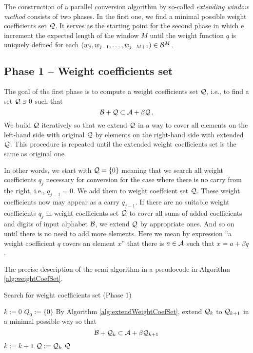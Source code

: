 The construction of a parallel conversion algorithm by so-called \emph{extending window method} consists of two phases. In the first one, we find a minimal possible weight coefficients set $\mathcal{Q}$. It serves as the starting point for the second phase in which e increment the expected length of the window $M$ until the weight function $q$ is uniquely defined for each $(w_j,w_{j-1}, \dots , w_{j-M+1}) \in \mathcal{B}^{M}$.

\subsection{Phase 1 -- Weight coefficients set}
The goal of the first phase is to compute a weight coefficients set $\mathcal{Q}$, i.e., to find a set $\mathcal{Q} \ni 0$ such that 
$$
    \mathcal{B} + \mathcal{Q} \subset \mathcal{A} + \beta \mathcal{Q}\,.
$$  
We build $\mathcal{Q}$ iteratively so that we extend $\mathcal{Q}$ in a way to cover all elements on the left-hand side with original $\mathcal{Q}$ by elements on the right-hand side with extended $\mathcal{Q}$. This procedure is repeated until the extended weight coefficients set is the same as original one. 

In other words, we start with $\mathcal{Q}=\{0\}$ meaning that we search all weight coefficients $q_j$ necessary for conversion for the case where there is no carry from the right, i.e., $q_{j-1}=0$. We add them to weight coeffcient set $\mathcal{Q}$. These weight coefficients now may appear as a carry $q_{j-1}$. If there are no suitable weight coefficients $q_j$ in weight coefficients set $\mathcal{Q}$ to cover all sums of added coefficients and digits of input alphabet $\mathcal{B}$, we extend $\mathcal{Q}$ by appropriate ones. And so on until there is no need to add more elements. Here we mean by expression ``a weight coefficient $q$ covers an element $x$'' that there is $a \in \mathcal{A}$ such that $x=a + \beta q$.
    
The precise description of the semi-algorithm in a pseudocode in Algorithm \ref{alg:weightCoefSet}.  
    
\begin{algorithm}
  \caption{Search for weight coefficients set (Phase 1)}
    \label{alg:weightCoefSet}
  \begin{algorithmic}[1]
    \STATE $k:=0$ 
    \STATE $Q_0:=\{0\}$
    \REPEAT
     \STATE  By Algorithm \ref{alg:extendWeightCoefSet}, extend $\mathcal{Q}_k$ to $\mathcal{Q}_{k+1}$ in a minimal possible way so that $$\mathcal{B}+ \mathcal{Q}_k \subset \mathcal{A} + \beta \mathcal{Q}_{k+1}$$
     \vspace{-20pt}
      \STATE  $k:=k+1$
      \STATE $\mathcal{Q}:=\mathcal{Q}_k$
    \RETURN $\mathcal{Q}$
  \end{algorithmic}
\end{algorithm}

